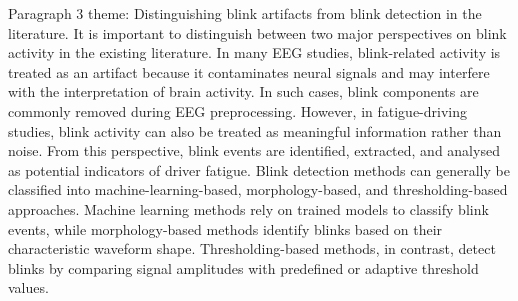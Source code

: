 

Paragraph 3 theme: Distinguishing blink artifacts from blink detection in the literature.
It is important to distinguish between two major perspectives on blink activity in the existing literature. In many EEG studies, blink-related activity is treated as an artifact because it contaminates neural signals and may interfere with the interpretation of brain activity. In such cases, blink components are commonly removed during EEG preprocessing. However, in fatigue-driving studies, blink activity can also be treated as meaningful information rather than noise. From this perspective, blink events are identified, extracted, and analysed as potential indicators of driver fatigue. Blink detection methods can generally be classified into machine-learning-based, morphology-based, and thresholding-based approaches. Machine learning methods rely on trained models to classify blink events, while morphology-based methods identify blinks based on their characteristic waveform shape. Thresholding-based methods, in contrast, detect blinks by comparing signal amplitudes with predefined or adaptive threshold values.